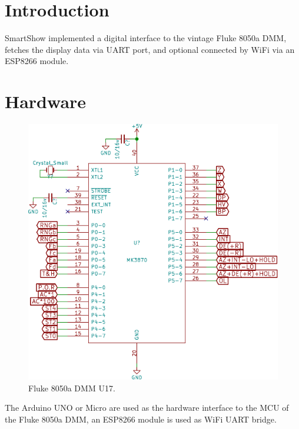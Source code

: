 \documentclass[a4paper,10pt]{article}
\title{\doctitle}
\author{\docauthor}
\date{}
\begin{document}
\maketitle
\tableofcontents


\section{Introduction}

SmartShow implemented a digital interface to the vintage Fluke 8050a DMM,
fetches the display data via UART port, and optional connected by WiFi via an ESP8266 module.




\section{Hardware}

\begin{figure}[h!t] \centering
    \includegraphics{figures/sch-fluke8050a-u17.pdf}
    \caption{Fluke 8050a DMM U17.} \label{fig:fluke8050a-u17}
\end{figure}

The Arduino UNO or Micro are used as the hardware interface to the MCU of the Fluke 8050a DMM,
an ESP8266 module is used as WiFi UART bridge.
\end{document}
